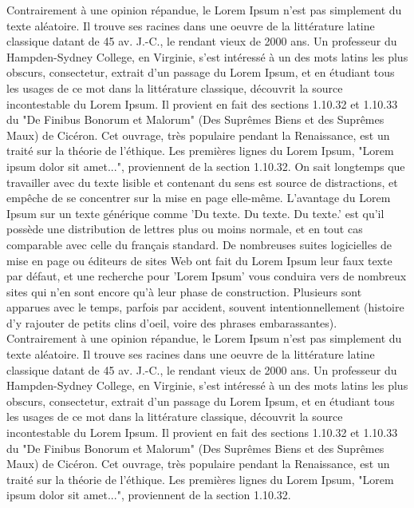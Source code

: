\documentclass{article}
\begin{document}
\pend
\pstart
Contrairement à une opinion répandue, le Lorem Ipsum n'est pas simplement du texte aléatoire. Il trouve ses racines dans une oeuvre de la littérature latine classique datant de 45 av. J.-C., le rendant vieux de 2000 ans. Un professeur du Hampden-Sydney College, en Virginie, s'est intéressé à un des mots latins les plus obscurs, consectetur, extrait d'un passage du Lorem Ipsum, et en étudiant tous les usages de ce mot dans la littérature classique, découvrit la source incontestable du Lorem Ipsum. Il provient en fait des sections 1.10.32 et 1.10.33 du "De Finibus Bonorum et Malorum" (Des Suprêmes Biens et des Suprêmes Maux) de Cicéron. Cet ouvrage, très populaire pendant la Renaissance, est un traité sur la théorie de l'éthique. Les premières lignes du Lorem Ipsum, "Lorem ipsum dolor sit amet...", proviennent de la section 1.10.32.
\pend
\pstart
On sait  longtemps que travailler avec du texte lisible et contenant du sens est source de distractions, et empêche de se concentrer sur la mise en page elle-même. L'avantage du Lorem Ipsum sur un texte générique comme 'Du texte. Du texte. Du texte.' est qu'il possède une distribution de lettres plus ou moins normale, et en tout cas comparable avec celle du français standard. De nombreuses suites logicielles de mise en page ou éditeurs de sites Web ont fait du Lorem Ipsum leur faux texte par défaut, et une recherche pour 'Lorem Ipsum' vous conduira vers de nombreux sites qui n'en sont encore qu'à leur phase de construction. Plusieurs  sont apparues avec le temps, parfois par accident, souvent intentionnellement (histoire d'y rajouter de petits clins d'oeil, voire des phrases embarassantes).
\pend
\pstart
Contrairement à une opinion répandue, le Lorem Ipsum n'est pas simplement du texte aléatoire. Il trouve ses racines dans une oeuvre de la littérature latine classique datant de 45 av. J.-C., le rendant vieux de 2000 ans. Un professeur du Hampden-Sydney College, en Virginie, s'est intéressé à un des mots latins les plus obscurs, consectetur, extrait d'un passage du Lorem Ipsum, et en étudiant tous les usages de ce mot dans la littérature classique, découvrit la source incontestable du Lorem Ipsum. Il provient en fait des sections 1.10.32 et 1.10.33 du "De Finibus Bonorum et Malorum" (Des Suprêmes Biens et des Suprêmes Maux) de Cicéron. Cet ouvrage, très populaire pendant la Renaissance, est un traité sur la théorie de l'éthique. Les premières lignes du Lorem Ipsum, "Lorem ipsum dolor sit amet...", proviennent de la section 1.10.32.
\pend
\endnumbering
\end{document}
